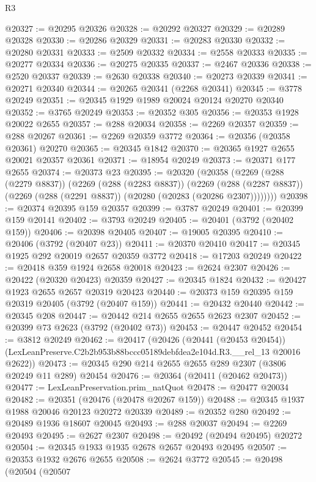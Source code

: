 \begin{lexlean}{R3}
\begin{coremodule}
@20327 := @20295 @20326
@20328 := @20292 @20327
@20329 := @20289 @20328
@20330 := @20286 @20329
@20331 := @20283 @20330
@20332 := @20280 @20331
@20333 := @2509 @20332
@20334 := @2558 @20333
@20335 := @20277 @20334
@20336 := @20275 @20335
@20337 := @2467 @20336
@20338 := @2520 @20337
@20339 := @2630 @20338
@20340 := @20273 @20339
@20341 := @20271 @20340
@20344 := @20265 @20341 (@2268 @20341)
@20345 := @3778 @20249
@20351 := @20345 @1929 @1989 @20024 @20124 @20270 @20340
@20352 := @3765 @20249
@20353 := @20352 @305
@20356 := @20353 @1928 @20022 @2655
@20357 := @288 @20034
@20358 := @2269 @20357
@20359 := @288 @20267
@20361 := @2269 @20359 @3772
@20364 := @20356 (@20358 @20361) @20270
@20365 := @20345 @1842
@20370 := @20365 @1927 @2655 @20021 @20357 @20361
@20371 := @18954 @20249
@20373 := @20371 @177 @2655
@20374 := @20373 @23
@20395 := @20320
    (@20358
      (@2269
        (@288 (@2279 @8837))
        (@2269
          (@288 (@2283 @8837))
          (@2269
            (@288 (@2287 @8837))
            (@2269 (@288 (@2291 @8837)) (@20280 (@20283 (@20286 @2307))))))))
@20398 := @20374 @20395 @159 @20357
@20399 := @3787 @20249
@20401 := @20399 @159 @20141
@20402 := @3793 @20249
@20405 := @20401 (@3792 (@20402 @159))
@20406 := @20398 @20405
@20407 := @19005 @20395
@20410 := @20406 (@3792 (@20407 @23))
@20411 := @20370 @20410
@20417 := @20345 @1925 @292 @20019 @2657 @20359 @3772
@20418 := @17203 @20249
@20422 := @20418 @359 @1924 @2658 @20018
@20423 := @2624 @2307
@20426 := @20422 (@20320 @20423) @20359
@20427 := @20345 @1824
@20432 := @20427 @1923 @2655 @2657 @20319 @20423
@20440 := @20373 @159 @20395 @159 @20319 @20405 (@3792 (@20407 @159))
@20441 := @20432 @20440
@20442 := @20345 @208
@20447 := @20442 @214 @2655 @2655 @2623 @2307
@20452 := @20399 @73 @2623 (@3792 (@20402 @73))
@20453 := @20447 @20452
@20454 := @3812 @20249
@20462 := @20417
    (@20426
      (@20441 (@20453 @20454))
      (LexLeanPreserve.C2b2b953b88bccc05189debfdea2e104d.R3.__rel_13 @20016 @2622))
@20473 := @20345 @290 @214 @2655 @2655 @289 @2307 (@3806 @20249 @11 @289) @20454
@20476 := @20364 (@20411 (@20462 @20473))
@20477 := LexLeanPreservation.prim_natQuot
@20478 := @20477 @20034
@20482 := @20351 (@20476 (@20478 @20267 @159))
@20488 := @20345 @1937 @1988 @20046 @20123 @20272 @20339
@20489 := @20352 @280
@20492 := @20489 @1936 @18607 @20045
@20493 := @288 @20037
@20494 := @2269 @20493
@20495 := @2627 @2307
@20498 := @20492 (@20494 @20495) @20272
@20504 := @20345 @1933 @1935 @2678 @2657 @20493 @20495
@20507 := @20353 @1932 @2676 @2655
@20508 := @2624 @3772
@20545 := @20498
    (@20504
      (@20507

\end{coremodule}
\end{lexlean}
